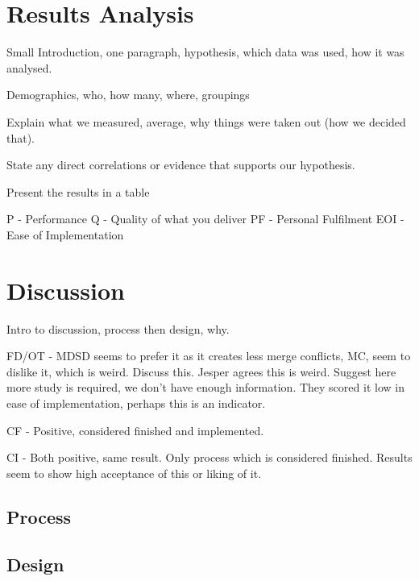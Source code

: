 \documentclass[final_report_innit.tex]{subfiles}
\begin{document}
\section{Results Analysis}

Small Introduction, one paragraph, hypothesis, which data was used, how it was analysed.

Demographics, who, how many, where, groupings

Explain what we measured, average, why things were taken out (how we decided that).

State any direct correlations or evidence that supports our hypothesis.

Present the results in a table

P - Performance
Q - Quality of what you deliver
PF - Personal Fulfilment
EOI - Ease of Implementation

\section{Discussion}

Intro to discussion, process then design, why.



FD/OT - MDSD seems to prefer it as it creates less merge conflicts, MC, seem to dislike it, which is weird. Discuss this. Jesper agrees this is weird. Suggest here more study is required, we don't have enough information. They scored it low in ease of implementation, perhaps this is an indicator.

CF - Positive, considered finished and implemented. 

CI - Both positive, same result. Only process which is considered finished. Results seem to show high acceptance of this or liking of it.

\subsection*{Process}

\subsection*{Design}
\end{document}
